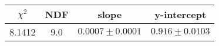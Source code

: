 \begin{tabular}{|c|c|c|c|}

\hline
$\chi^{2}$ & NDF & slope & y-intercept  \\
\hline
8.1412 & 9.0 & $0.0007\pm0.0001$ & $0.916\pm0.0103$ \\
\hline

\end{tabular}